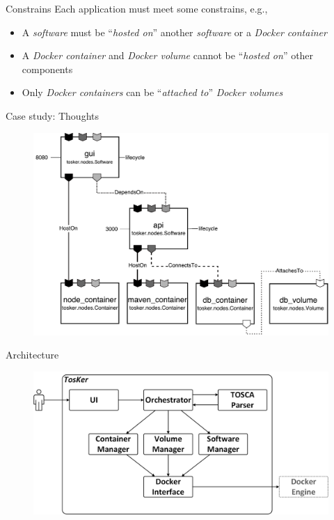 \documentclass{beamer}
\begin{document}
  \begin{frame}{Constrains}
    Each application must meet some constrains, e.g.,
    \begin{itemize}
      \item \small A \emph{software} must be ``\emph{hosted on}'' another \emph{software} or a \emph{Docker container}
      \item \small A \emph{Docker container} and \emph{Docker volume} cannot be ``\emph{hosted on}'' other components
      \item \small Only \emph{Docker containers} can be ``\emph{attached to}'' \emph{Docker volumes}
    \end{itemize}
  \end{frame}

  \begin{frame}{Case study: Thoughts}
    \begin{figure}
      \includegraphics[width=\textwidth]{img/thoughts_architecture.pdf}
    \end{figure}
  \end{frame}

  \begin{frame}{Architecture}
    \begin{figure}
      \includegraphics[width=\textwidth]{img/architecture.png}
    \end{figure}
  \end{frame}
\end{document}
